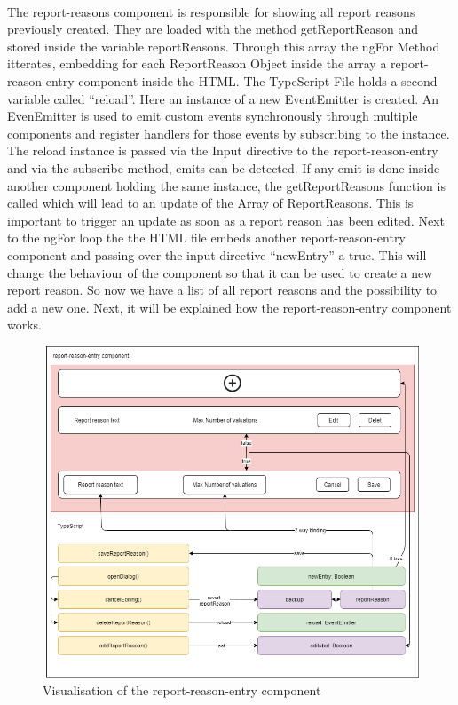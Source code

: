 \vspace{5mm}
\\
The report-reasons component is responsible for showing all report reasons previously created. They are loaded with the method getReportReason and stored inside the variable reportReasons. Through this array the ngFor Method itterates, embedding for each ReportReason Object inside the array a report-reason-entry component inside the HTML. The TypeScript File holds a second variable called \enquote{reload}. Here an instance of a new EventEmitter is created. An EvenEmitter is used to emit custom events synchronously through multiple components and register handlers for those events by subscribing to the instance. The reload instance is passed via the Input directive to the report-reason-entry and via the subscribe method, emits can be detected. If any emit is done inside another component holding the same instance, the getReportReasons function is called which will lead to an update of the Array of ReportReasons. This is important to trigger an update as soon as a report reason has been edited. Next to the ngFor loop the the HTML file embeds another report-reason-entry component and passing over the input directive \enquote{newEntry} a true. This will change the behaviour of the component so that it can be used to create a new report reason.
So now we have a list of all report reasons and the possibility to add a new one. Next, it will be explained how
the report-reason-entry component works.
\begin{figure}[h]
    \centering
    \includegraphics[width=1.0\textwidth]{./images/report_reason_entry_3}
    \caption{Visualisation of the report-reason-entry component}
    \label{fig:reportreasonent}
\end{figure}
